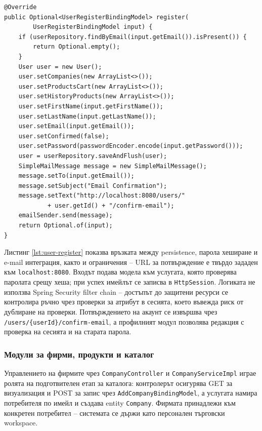 \noindent\begin{minipage}{\linewidth}
\begin{lstlisting}[caption={Опростен вид на регистрационната логика},label={lst:user-register}]
@Override
public Optional<UserRegisterBindingModel> register(
        UserRegisterBindingModel input) {
    if (userRepository.findByEmail(input.getEmail()).isPresent()) {
        return Optional.empty();
    }
    User user = new User();
    user.setCompanies(new ArrayList<>());
    user.setProductsCart(new ArrayList<>());
    user.setHistoryProducts(new ArrayList<>());
    user.setFirstName(input.getFirstName());
    user.setLastName(input.getLastName());
    user.setEmail(input.getEmail());
    user.setConfirmed(false);
    user.setPassword(passwordEncoder.encode(input.getPassword()));
    user = userRepository.saveAndFlush(user);
    SimpleMailMessage message = new SimpleMailMessage();
    message.setTo(input.getEmail());
    message.setSubject("Email Confirmation");
    message.setText("http://localhost:8080/users/"
            + user.getId() + "/confirm-email");
    emailSender.send(message);
    return Optional.of(input);
}
\end{lstlisting}
\end{minipage}

Листинг \ref{lst:user-register} показва връзката между persistence, парола хеширане и e-mail интеграция, както и ограничения -- URL за потвърждение е твърдо зададен към \texttt{localhost:8080}. Входът подава модела към услугата, която проверява паролата срещу хеша; при успех имейлът се записва в \texttt{HttpSession}. Логиката не използва Spring Security filter chain -- достъпът до защитени ресурси се контролира ръчно чрез проверки за атрибут в сесията, което въвежда риск от дублиране на проверки. Потвърждението на акаунт се извършва чрез \texttt{/users/\{userId\}/confirm-email}, а профилният модул позволява редакция с проверка на сесията и на старата парола.

\subsubsection{Модули за фирми, продукти и каталог}

Управлението на фирмите чрез \texttt{CompanyController} и \texttt{CompanyServiceImpl} играе ролята на подготвителен етап за каталога: контролерът осигурява GET за визуализация и POST за запис чрез \texttt{AddCompanyBindingModel}, а услугата намира потребителя по имейл и създава entity \texttt{Company}. Фирмата принадлежи към конкретен потребител -- системата се държи като персонален търговски workspace.

